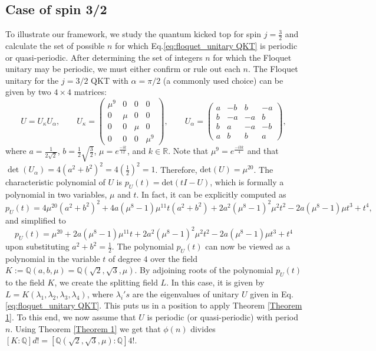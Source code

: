 \documentclass[a4paper,onecolumn,accepted=2026-04-08,10pt]{quantumarticle}
\theoremstyle{definition}
\begin{document}
\subsection{Case of spin 3/2}
To illustrate our framework, we study the quantum kicked top for spin $j=\frac{3}{2}$ and calculate the set of possible $n$ for which Eq.\eqref{eq:floquet_unitary QKT} is periodic or quasi-periodic. After determining the set of integers $n$ for which the Floquet unitary may be periodic, we must either confirm or rule out each $n$.  The Floquet unitary for the $j=3/2$ QKT with $\alpha=\pi/2$ (a commonly used choice) can be given by two $4 \times 4$ matrices:
\begin{equation}
U=U_{\kappa}U_{\alpha}, \qquad  U_{\kappa} = \begin{pmatrix} \mu^9 & 0 & 0 & 0 \\ 0 & \mu & 0 & 0 \\ 0 & 0 & \mu & 0 \\ 0 & 0 & 0 & \mu^9\end{pmatrix}, \qquad U_{\alpha} = \begin{pmatrix} a & -b & b & -a \\ b & -a & -a & b \\ b & a & -a & -b \\ a & b & b & a\end{pmatrix},
\end{equation}
where $a = \frac{1}{2\sqrt{2}}$, $b = \frac{1}{2} \sqrt{\frac{3}{2}}$, $\mu = e^{\frac{-ik}{12}}$, and $k \in \mathbb R$. Note that $\mu^9 = e^{\frac{-i3k}{4}}$ and that $\det(U_{\alpha}) = 4(a^2 + b^2)^2 = 4 (\frac{1}{2})^2 = 1$. Therefore, $\text{det}(U) = \mu^{20}$. The characteristic polynomial of $U$ is $p_{U}(t) = \text{det}(tI - U)$, which is formally a polynomial in two variables, $\mu$ and $t$. In fact, it can be explicitly computed as 
\begin{equation}\label{eq:polynomial for QKT unitary}
    p_{U}(t) = 4\mu^{20}(a^2 + b^2)^2 + 4a(\mu^{8} - 1)\mu^{11} t(a^2 + b^2) + 2a^2 (\mu^8 - 1)^2 \mu^2 t^2 - 2a(\mu^8 - 1 )\mu t^3 + t^4,
\end{equation}
and simplified to
\begin{equation}\label{eq: simplified polynomial for QKT unitary}
   p_{U}(t) = \mu^{20} + 2a(\mu^{8} - 1)\mu^{11} t + 2a^2 (\mu^8 - 1)^2 \mu^2t^2 - 2a(\mu^8 - 1 )\mu t^3 + t^4 
\end{equation}
upon substituting $a^2 + b^2 = \frac{1}{2}$.  The polynomial $p_{U}(t)$ can now be viewed as a polynomial in the variable $t$ of degree $4$ over the field $K := \mathbb{Q}(a,b,\mu) = \mathbb{Q}(\sqrt{2}, \sqrt{3}, \mu)$. By adjoining roots of the polynomial $p_{U}(t)$ to the field $K$, we create the splitting field $L$. In this case, it is given by $L=K(\lambda_1,\lambda_2,\lambda_3,\lambda_4)$, where $\lambda_i's$ are the eigenvalues of unitary $U$ given in Eq. \eqref{eq:floquet_unitary QKT}. This puts us in a position to apply Theorem \ref{Theorem 1}.
To this end, we now assume that $U$ is periodic (or quasi-periodic) with period $n$. Using Theorem \ref{Theorem 1} we get that $\phi(n)$ divides $[K:\mathbb{Q}]d! = [\mathbb{Q}(\sqrt{2}, \sqrt{3}, \mu) : \mathbb{Q}]4!.$ 
\end{document}
